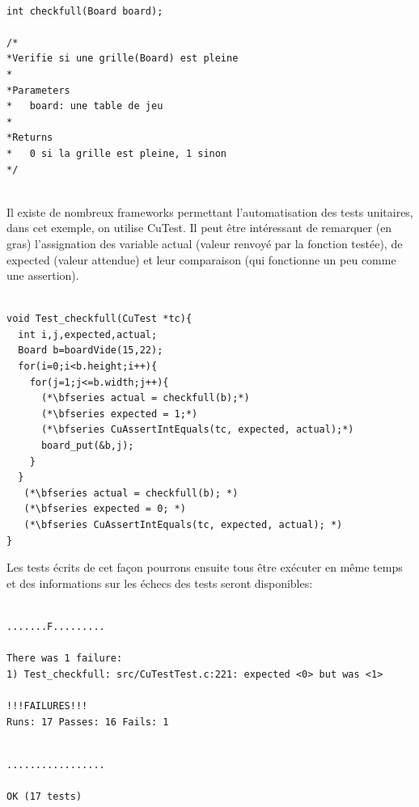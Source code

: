 \documentclass{report}
\begin{document}
\begin{scriptsize}
\begin{lstlisting}

int checkfull(Board board);

/*
*Verifie si une grille(Board) est pleine
*
*Parameters
*   board: une table de jeu
*
*Returns
*   0 si la grille est pleine, 1 sinon
*/


\end{lstlisting}
\end{scriptsize}

Il existe de nombreux frameworks permettant l'automatisation des tests unitaires, dans cet exemple, on utilise CuTest. Il peut être intéressant de remarquer (en gras) l'assignation des variable actual (valeur renvoyé par la fonction testée), de  expected (valeur attendue) et leur comparaison (qui fonctionne un peu comme une assertion).
\begin{scriptsize}
\begin{lstlisting}

void Test_checkfull(CuTest *tc){
  int i,j,expected,actual;
  Board b=boardVide(15,22);
  for(i=0;i<b.height;i++){
    for(j=1;j<=b.width;j++){
      (*\bfseries actual = checkfull(b);*)
      (*\bfseries expected = 1;*)
      (*\bfseries CuAssertIntEquals(tc, expected, actual);*)
      board_put(&b,j);
    }
  }
   (*\bfseries actual = checkfull(b); *)
   (*\bfseries expected = 0; *)
   (*\bfseries CuAssertIntEquals(tc, expected, actual); *)
}

\end{lstlisting}
\end{scriptsize}

Les tests écrits de cet façon pourrons ensuite tous être exécuter en même temps et des informations sur les échecs des tests seront disponibles:

\begin{scriptsize}
\begin{lstlisting}

.......F.........

There was 1 failure:
1) Test_checkfull: src/CuTestTest.c:221: expected <0> but was <1>

!!!FAILURES!!!
Runs: 17 Passes: 16 Fails: 1

\end{lstlisting}
\begin{lstlisting}

.................

OK (17 tests)
\end{lstlisting}
\end{scriptsize}
\end{document}
